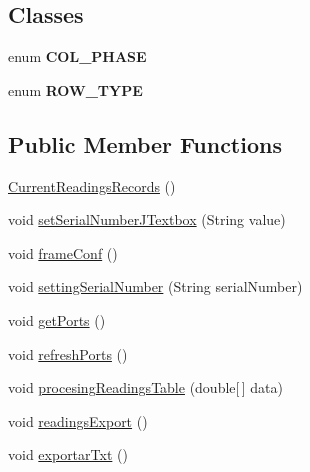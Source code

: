 \subsection*{Classes}
\begin{DoxyCompactItemize}
\item 
enum {\bfseries C\+O\+L\+\_\+\+P\+H\+A\+SE}
\item 
enum {\bfseries R\+O\+W\+\_\+\+T\+Y\+PE}
\end{DoxyCompactItemize}
\subsection*{Public Member Functions}
\begin{DoxyCompactItemize}
\item 
\hyperlink{classcom_1_1eneri_1_1scorpio__metertool_1_1ui_1_1_current_readings_records_a55868671df89636726603f01f0a3691a}{Current\+Readings\+Records} ()
\item 
void \hyperlink{classcom_1_1eneri_1_1scorpio__metertool_1_1ui_1_1_current_readings_records_a121a699a12b86e862c37f2f701447db8}{set\+Serial\+Number\+J\+Textbox} (String value)
\item 
void \hyperlink{classcom_1_1eneri_1_1scorpio__metertool_1_1ui_1_1_current_readings_records_a9d0651a0d83ff68cf11f20bcabdf613b}{frame\+Conf} ()
\item 
void \hyperlink{classcom_1_1eneri_1_1scorpio__metertool_1_1ui_1_1_current_readings_records_a57cd16e88f18fc30e44a94c4fc849c79}{setting\+Serial\+Number} (String serial\+Number)
\item 
void \hyperlink{classcom_1_1eneri_1_1scorpio__metertool_1_1ui_1_1_current_readings_records_adc7ca6da6812a748f0a8e5fa62dc79ae}{get\+Ports} ()
\item 
void \hyperlink{classcom_1_1eneri_1_1scorpio__metertool_1_1ui_1_1_current_readings_records_a8996510686aaa3fc8ad2d9266862e0cf}{refresh\+Ports} ()
\item 
void \hyperlink{classcom_1_1eneri_1_1scorpio__metertool_1_1ui_1_1_current_readings_records_a93fd85ca7fe07a6067d0f6b195cb4794}{procesing\+Readings\+Table} (double\mbox{[}$\,$\mbox{]} data)
\item 
void \hyperlink{classcom_1_1eneri_1_1scorpio__metertool_1_1ui_1_1_current_readings_records_ad3cec83b81d2db934df10fd1373e6319}{readings\+Export} ()
\item 
void \hyperlink{classcom_1_1eneri_1_1scorpio__metertool_1_1ui_1_1_current_readings_records_a6510d74e5b7a82262c405def62888d8e}{exportar\+Txt} ()
\item 

\end{DoxyCompactItemize}
